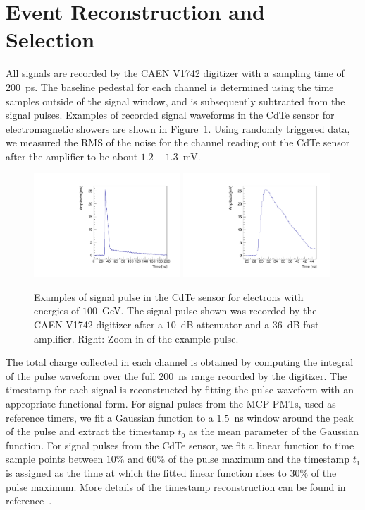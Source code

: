 
\section{Event Reconstruction and Selection }
\label{sec:reco}

All signals are recorded by the CAEN V1742 digitizer with a sampling time of $200$~ps.
The baseline pedestal for each channel is determined using the time samples outside of
the signal window, and is subsequently subtracted from the signal pulses. Examples of recorded
signal waveforms in the CdTe sensor for electromagnetic showers are shown in Figure~\ref{fig:Pulses}.
Using randomly triggered data, we measured the RMS of the noise for the channel reading out 
the CdTe sensor after the amplifier to be about $1.2-1.3$~mV. 

\begin{figure}[htbp] 
\centering
\includegraphics[width=0.49\textwidth]{figures/CdTe_pulse.pdf}
\includegraphics[width=0.49\textwidth]{figures/CdTe_pulseZ.pdf} 
\caption{Examples of signal pulse in the CdTe sensor for electrons with energies of $100$~GeV. 
The signal pulse shown was recorded by the CAEN V1742 digitizer after a $10$~dB 
attenuator and a $36$~dB fast amplifier. Right: Zoom in of the example pulse. } 
\label{fig:Pulses} 
\end{figure} 

The total charge collected in each channel is obtained by computing the integral of the pulse
waveform over the full $200$~ns range recorded by the digitizer. 
The timestamp for each signal is reconstructed by fitting the pulse waveform with
an appropriate functional form. For signal pulses from the MCP-PMTs, used as reference timers, 
we fit a Gaussian function to a $1.5$~ns window around the peak of the pulse and extract the 
timestamp $t_{0}$ as the mean parameter of the Gaussian function. For signal pulses from the
CdTe sensor, we fit a linear function to time sample points between $10\%$ and $60\%$ of the pulse
maximum and the timestamp $t_{1}$ is assigned as the time at which the fitted linear function
rises to $30\%$ of the pulse maximum. More details of the timestamp reconstruction can be
found in reference~\cite{Anderson:2015gha}.


